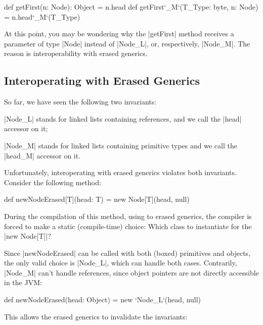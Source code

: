 \begin{lstlisting-nobreak}
 def getFirst(n: Node): Object = n.head
 def getFirst`_M`(T_Type: byte, n: Node) = n.head`_M`(T_Type)
\end{lstlisting-nobreak}

At this point, you may be wondering why the |getFirst| method receives a parameter of type |Node| instead of |Node_L|, or, respectively, |Node_M|. The reason is interoperability with erased generics.


\subsection{Interoperating with Erased Generics}

So far, we have seen the following two invariants:
\begin{compactitem}
 \item |Node_L| stands for linked lists containing references, and we call the |head| accessor on it;
 \item |Node_M| stands for linked lists containing primitive types and we call the |head_M| accessor on it.
\end{compactitem}

Unfortunately, interoperating with erased generics violates both invariants. Consider the following method:

\begin{lstlisting-nobreak}
 def newNodeErased[T](head: T) =
   new Node[T](head, null)
\end{lstlisting-nobreak}

During the compilation of this method, using to erased generics, the compiler is forced to make a static (compile-time) choice: Which class to instantiate for the |new Node[T]|?

Since |newNodeErased| can be called with both (boxed) primitives and objects, the only valid choice is |Node_L|, which can handle both cases. Contrarily, |Node_M| can't handle references, since object pointers are not directly accessible in the JVM: %

\begin{lstlisting-nobreak}
 def newNodeErased(head: Object) =
   new `Node_L`(head, null)
\end{lstlisting-nobreak}

This allows the erased generics to invalidate the invariants:

